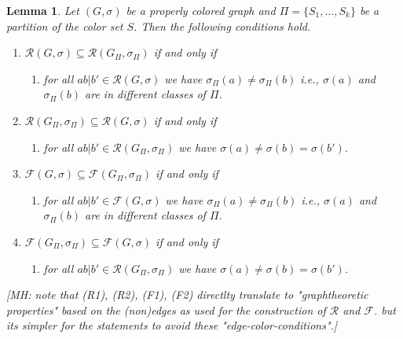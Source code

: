 \documentclass[final,3p,times]{elsarticle}
\newtheorem{lemma}[theorem]{Lemma}%
\newcommand{\TODO}[1]{\begingroup\color{red}#1\endgroup}
\begin{document}
\begin{lemma}\label{lem:R-Ri}
	Let $(G,\sigma)$ be a properly colored graph and $\Pi =  \{S_1,\dots,S_k\}$
	be a partition of the color set $S$. Then the following conditions hold. 
	
	\begin{enumerate}
 		\item $\mathscr{R}(G,\sigma) \subseteq \mathscr{R}(G_\Pi,\sigma_\Pi)$
 			  	  if and only if 
	
			\begin{enumerate}[noitemsep]
 			  	 \item[(R1):]  for all $ab|b' \in \mathscr{R}(G,\sigma)$ we have 
 			  	 $\sigma_\Pi(a) \neq  \sigma_\Pi(b)$ 
			      i.e., $\sigma(a)$ and $\sigma_\Pi(b)$ are in different classes
			      of  $\Pi$. 	
			\end{enumerate}			      

 		\item $\mathscr{R}(G_\Pi,\sigma_\Pi)  \subseteq  \mathscr{R}(G,\sigma)$
 			  	  if and only if 			  	   
	
			\begin{enumerate}[noitemsep]
 			  	 \item[(R2):] for all $ab|b' \in \mathscr{R}(G_\Pi,\sigma_\Pi)$ we have 
 			  	 $\sigma(a) \neq \sigma(b) = \sigma(b')$. 
			\end{enumerate}			      
			      
 		\item $\mathscr{F}(G,\sigma) \subseteq \mathscr{F}(G_\Pi,\sigma_\Pi)$
 			  	  if and only if 
	
			\begin{enumerate}[noitemsep]
 			  	 \item[(F1):]  for all $ab|b' \in \mathscr{F}(G,\sigma)$ we have 
 			  	 $\sigma_\Pi(a) \neq  \sigma_\Pi(b)$ 
			      i.e., $\sigma(a)$ and $\sigma_\Pi(b)$ are in different classes
			      of  $\Pi$. 	
			\end{enumerate}			      

 		\item $\mathscr{F}(G_\Pi,\sigma_\Pi)  \subseteq  \mathscr{F}(G,\sigma)$
 			  	  if and only if 			  	   
	
			\begin{enumerate}[noitemsep]
 			  	 \item[(F2):] for all $ab|b' \in \mathscr{R}(G_\Pi,\sigma_\Pi)$ we have 
 			  	 $\sigma(a) \neq \sigma(b) = \sigma(b')$. 
			\end{enumerate}			      
	\end{enumerate}
	\TODO{[MH: note that (R1),  (R2),  (F1),  (F2) directlty translate to
	     "graphtheoretic properties" based on the (non)edges as used 
	     for the construction of $\mathscr{R}$ and $\mathscr{F}$. 
	     but its simpler for the statements to avoid these "edge-color-conditions".] }
\end{lemma}
\end{document}
